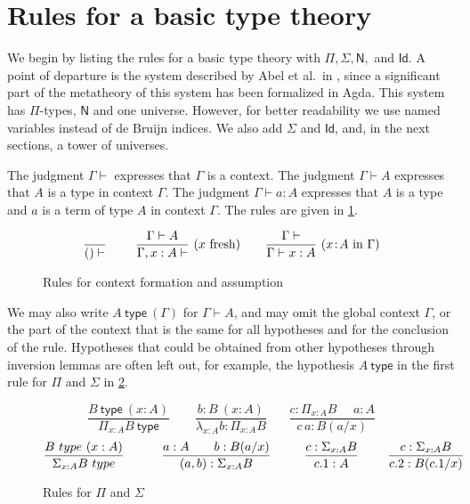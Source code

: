\documentclass[a4paper,UKenglish,cleveref, autoref, thm-restate]{lipics-v2021}
\newcommand{\Id}{\mathsf{Id}}
\newcommand{\NN}{\mathsf{N}}
\newcommand{\type}{\mathsf{type}}
\newcommand{\mylam}[3]{\lambda_{#1:#2}#3}
\newcommand{\mypi}[3]{\Pi_{#1:#2}#3}
\newcommand{\mysig}[3]{\Sigma_{#1:#2}#3}
\newcommand{\app}[2]{{#1\,#2}} %
\begin{document}
\section{Rules for a basic type theory}\label{sec:basic}

We begin by listing the rules for a basic type theory
with $\Pi, \Sigma, \NN,$ and $\Id$. A point of departure is
the system described by Abel et al.\ in \cite{abel18}, since a
significant part of the metatheory of this system has been formalized in Agda.
This system has $\Pi$-types, $\NN$ and one universe.
However, for better readability we use named variables instead
of de Bruijn indices. We also add $\Sigma$ and $\Id$, and,
in the next sections, a tower of universes.

The judgment $\Gamma\vdash$ expresses that $\Gamma$ is a context.
The judgment $\Gamma\vdash A$ expresses that $A$ is a type in context $\Gamma$.
The judgment $\Gamma\vdash a:A$ expresses that $A$ is a type
and $a$ is a term of type $A$ in context $\Gamma$. The rules are given in \cref{fig:context}.

\begin{figure}[h!]
$$
\frac{}{()\vdash}~~~~~~~
\frac{\Gamma\vdash A}{\Gamma,x:A\vdash}~(x~\text{fresh})~~~~~~
\frac{\Gamma\vdash}{\Gamma\vdash x:A}~(x\!:\! A~\text{in}~\Gamma)
\belowdisplayshortskip 0pt
$$
\caption{Rules for context formation and assumption}\label{fig:context}
\end{figure}

We may also write $A~\type~(\Gamma)$ for $\Gamma\vdash A$,
and may omit the global context $\Gamma$,
or the part of the context that is the same for all hypotheses and for the
conclusion of the rule.
Hypotheses that could be obtained from other
hypotheses through inversion lemmas are often left out,
for example, the hypothesis $A~\type$ in the first rule for $\Pi$ and $\Sigma$
in \cref{fig:PiSig}.

\begin{figure}[h!]
$$
\frac{B~\type~(x:A)}{\mypi{x}{A}{B}~\type}~~~~~~~~~
\frac{b:B~(x:A)}{\mylam{x}{A}{b}:\mypi{x}{A}{B}}~~~~~~~~
\frac{c:\mypi{x}{A}{B}~~~~~~a:A}
     {\app{c}{a}:B(a/x)}
$$
$$
\frac{B~\type~(x:A)}{\mysig{x}{A}{B}~\type}~~~~~~~~~
\frac{a:A~~~~~~b:B(a/x)}{(a,b):\mysig{x}{A}{B}}~~~~~~~~
\frac{c:\mysig{x}{A}{B}}{c.1:A}~~~~~~~
\frac{c:\mysig{x}{A}{B}}{c.2:B(c.1/x)}
\belowdisplayshortskip -1pt
$$
  \caption{Rules for $\Pi$ and $\Sigma$}\label{fig:PiSig}
\end{figure}
\end{document}
